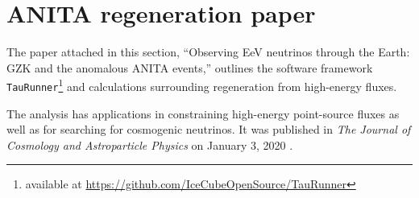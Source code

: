 \chapter{ANITA \nutau regeneration paper}
\label{app:ANITA_few_author}

The paper attached in this section, ``Observing EeV neutrinos through the Earth: GZK and the anomalous ANITA events,'' outlines the software framework \texttt{TauRunner}\footnote{available at \url{https://github.com/IceCubeOpenSource/TauRunner}} and calculations surrounding \nutau regeneration from high-energy \nutau fluxes. 

The analysis has applications in constraining high-energy \nutau point-source fluxes as well as for searching for cosmogenic neutrinos. It was published in \textit{The Journal of Cosmology and Astroparticle Physics} on January 3, 2020 \citep{Safa:2019ege}.

